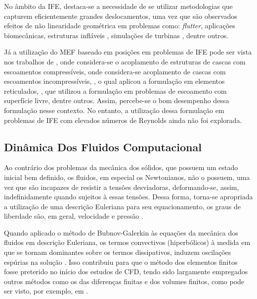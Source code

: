No âmbito da IFE, destaca-se a necessidade de se utilizar metodologias que capturem eficientemente grandes deslocamentos, uma vez que são observados efeitos de não linearidade geométrica em problemas como: \textit{flutter}, aplicações biomecânicas, estruturas infláveis \cite{karagiozis2011computational}, simulações de turbinas \cite{bazilevs20113d}, dentre outros.

Já a utilização do MEF baseado em posições em problemas de IFE pode ser vista nos trabalhos de , onde considera-se o acoplamento de estruturas de cascas com escoamentos compressíveis,  onde considera-se acoplamento de cascas com escoamentos incompressíveis, , o qual aplicou a formulação em elementos reticulados, , que utilizou a formulação em problemas de escoamento com superfície livre, dentre outros. Assim, percebe-se o bom desempenho dessa formulação nesse contexto. No entanto, a utilização dessa formulação em problemas de IFE com elevados números de Reynolds ainda não foi explorada.


\subsection{Dinâmica Dos Fluidos Computacional} \label{CFD}

Ao contrário dos problemas da mecânica dos sólidos, que possuem um estado inicial bem definido, os fluidos, em especial os Newtonianos, não o possuem, uma vez que são incapazes de resistir a tensões desviadoras, deformando-se, assim, indefinidamente quando sujeitos à essas tensões. Dessa forma, torna-se apropriada a utilização de uma descrição Euleriana para seu equacionamento, os graus de liberdade são, em geral, velocidade e pressão \cite{fernandes2020tecnica}.

Quando aplicado o método de Bubnov-Galerkin às equações da mecânica dos fluidos em descrição Euleriana, os termos convectivos (hiperbólicos) à medida em que se tornam dominantes sobre os termos dissipativos, induzem oscilações espúrias na solução \cite{bazilevs2013computational,brooks1982streamline}. Isso contribuiu para que o método dos elementos finitos fosse preterido no início dos estudos de CFD, tendo sido largamente empregados outros métodos como os das diferenças finitas e dos volumes finitos, como pode ser visto, por exemplo, em .

